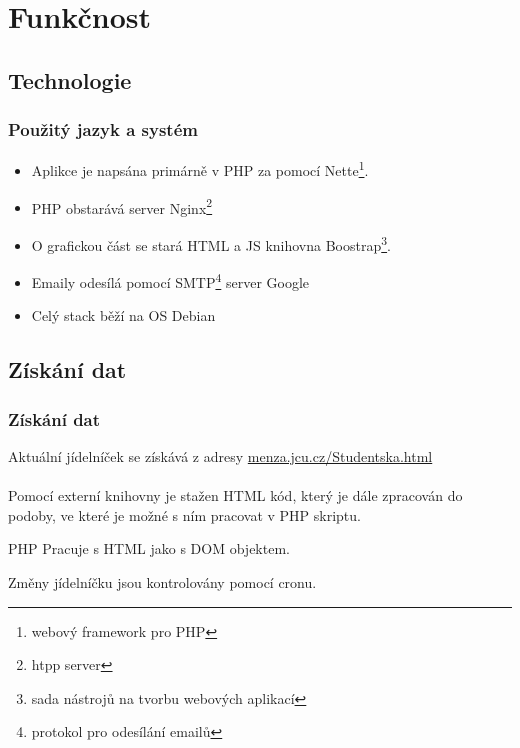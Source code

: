 \documentclass[slidestop]{beamer}
\begin{document}
\section{Funkčnost}
\subsection{Technologie}
\begin{frame}
\frametitle{Použitý jazyk a systém}
\vfill
\begin{itemize}

\item Aplikce je napsána primárně v PHP za pomocí Nette\footnote{webový framework pro PHP}.

\item PHP obstarává server Nginx\footnote{htpp server}

\item O grafickou část se stará HTML a JS knihovna Boostrap\footnote{sada nástrojů na tvorbu webových aplikací}.

\item Emaily odesílá pomocí SMTP\footnote{protokol pro odesílání emailů} server Google

\item Celý stack běží na OS Debian

\end{itemize}
\vfill
\end{frame}
\subsection{Získání dat}
\begin{frame}
\frametitle{Získání dat}
\vfill
Aktuální jídelníček se získává z adresy \href{http://menza.jcu.cz/Studentska.html}{menza.jcu.cz/Studentska.html}
\\~\\
Pomocí externí knihovny je stažen HTML kód, který je dále zpracován do podoby, ve které je možné s ním pracovat v PHP skriptu.

\begin{alertblock}{PHP}
Pracuje s HTML jako s DOM objektem.
\end{alertblock}

Změny jídelníčku jsou kontrolovány pomocí cronu.
\vfill
\end{frame}
\end{document}
